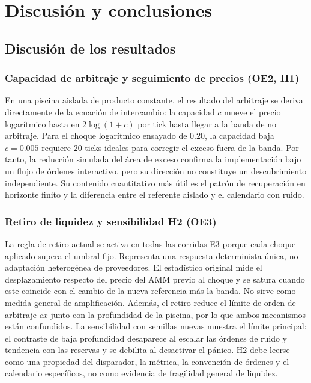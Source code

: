\chapter{Discusión y conclusiones}
\label{cap:discusion}

\section{Discusión de los resultados}

\subsection{Capacidad de arbitraje y seguimiento de precios (OE2, H1)}

En una piscina aislada de producto constante, el resultado del arbitraje se deriva directamente de la ecuación de intercambio: la capacidad $c$ mueve el precio logarítmico hasta en $2\log(1+c)$ por tick hasta llegar a la banda de no arbitraje. Para el choque logarítmico ensayado de $0.20$, la capacidad baja $c=0.005$ requiere 20 ticks ideales para corregir el exceso fuera de la banda. Por tanto, la reducción simulada del área de exceso confirma la implementación bajo un flujo de órdenes interactivo, pero su dirección no constituye un descubrimiento independiente. Su contenido cuantitativo más útil es el patrón de recuperación en horizonte finito y la diferencia entre el referente aislado y el calendario con ruido.

\subsection{Retiro de liquidez y sensibilidad H2 (OE3)}

La regla de retiro actual se activa en todas las corridas E3 porque cada choque aplicado supera el umbral fijo. Representa una respuesta determinista única, no adaptación heterogénea de proveedores. El estadístico original mide el desplazamiento respecto del precio del AMM previo al choque y se satura cuando este coincide con el cambio de la nueva referencia más la banda. No sirve como medida general de amplificación. Además, el retiro reduce el límite de orden de arbitraje $c x$ junto con la profundidad de la piscina, por lo que ambos mecanismos están confundidos. La sensibilidad con semillas nuevas muestra el límite principal: el contraste de baja profundidad desaparece al escalar las órdenes de ruido y tendencia con las reservas y se debilita al desactivar el pánico. H2 debe leerse como una propiedad del disparador, la métrica, la convención de órdenes y el calendario específicos, no como evidencia de fragilidad general de liquidez.

